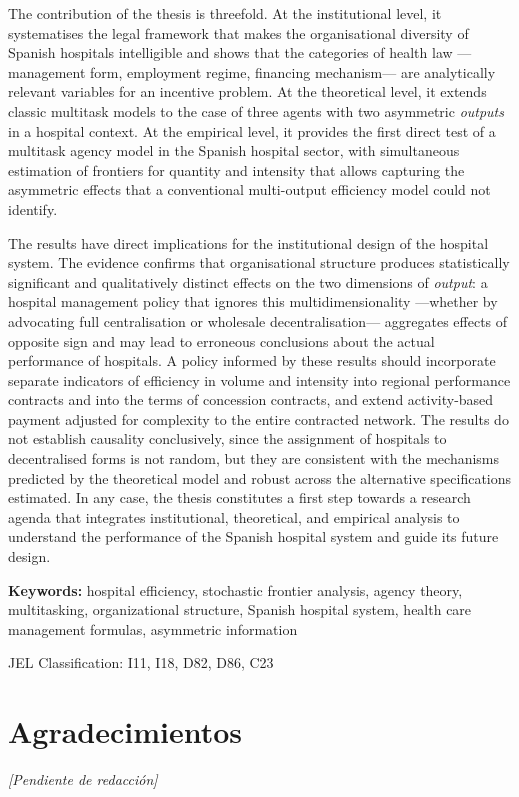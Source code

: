 The contribution of the thesis is threefold. At the institutional 
level, it systematises the legal framework that makes the 
organisational diversity of Spanish hospitals intelligible and 
shows that the categories of health law ---management form, 
employment regime, financing mechanism--- are analytically relevant 
variables for an incentive problem. At the theoretical level, it 
extends classic multitask models to the case of three agents with 
two asymmetric \textit{outputs} in a hospital context. At the 
empirical level, it provides the first direct test of a multitask 
agency model in the Spanish hospital sector, with simultaneous 
estimation of frontiers for quantity and intensity that allows 
capturing the asymmetric effects that a conventional multi-output 
efficiency model could not identify.

The results have direct implications for the institutional design 
of the hospital system. The evidence confirms that organisational 
structure produces statistically significant and qualitatively 
distinct effects on the two dimensions of \textit{output}: a 
hospital management policy that ignores this multidimensionality 
---whether by advocating full centralisation or wholesale 
decentralisation--- aggregates effects of opposite sign and may 
lead to erroneous conclusions about the actual performance of 
hospitals. A policy informed by these results should incorporate 
separate indicators of efficiency in volume and intensity into 
regional performance contracts and into the terms of concession 
contracts, and extend activity-based payment adjusted for complexity 
to the entire contracted network. The results do not establish 
causality conclusively, since the assignment of hospitals to 
decentralised forms is not random, but they are consistent with 
the mechanisms predicted by the theoretical model and robust across 
the alternative specifications estimated. In any case, the thesis 
constitutes a first step towards a research agenda that integrates 
institutional, theoretical, and empirical analysis to understand 
the performance of the Spanish hospital system and guide its 
future design.

\medskip
\noindent
\textbf{Keywords:} hospital efficiency, stochastic frontier analysis, agency theory, multitasking, organizational structure, Spanish hospital system, health care management formulas, asymmetric information

\medskip
\noindent JEL Classification: I11, I18, D82, D86, C23

\chapter*{Agradecimientos}
\vspace{2cm}
\begin{center}
\textit{[Pendiente de redacción]}
\end{center}

\tableofcontents
\listoftables
\listoffigures

